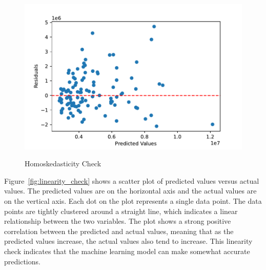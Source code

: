 \documentclass[12pt]{article}
\begin{document}
\begin{figure}[t]
    \caption{Homoskedasticity Check}
    \includegraphics[width=1\textwidth]{homoskedasticity_check.pdf}
    \label{fig:homoskedasticity_check}

\end{figure}
Figure~\ref{fig:linearity_check} shows a scatter plot of predicted values versus actual values. The predicted values are on the horizontal axis and the actual values are on the vertical axis. Each dot on the plot represents a single data point. The data points are tightly clustered around a straight line, which indicates a linear relationship between the two variables. The plot shows a strong positive correlation between the predicted and actual values, meaning that as the predicted values increase, the actual values also tend to increase. This linearity check indicates that the machine learning model can make somewhat accurate predictions. 
\end{document}
